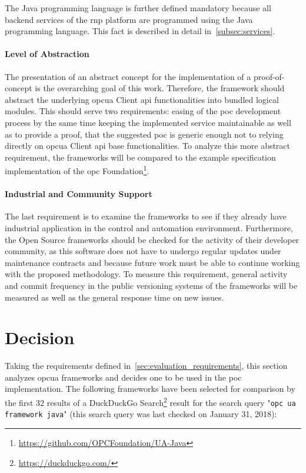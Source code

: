 \documentclass[
a4paper,
twoside,
headsepline,
cleardoublepage=empty,
parskip=half,
draft=false
]{scrbook}
\begin{document}
			The Java programming language is further defined mandatory because all backend services of the \gls{rnp} platform are programmed using the Java programming language.
			This fact is described in detail in~\cref{subsec:services}.
			
			\paragraph{Level of Abstraction} The presentation of an abstract concept for the implementation of a proof-of-concept is the overarching goal of this work. 
			Therefore, the framework should abstract the underlying \gls{opcua} Client \gls{api} functionalities into bundled logical modules. 
			This should serve two requirements: easing of the \gls{poc} development process by the same time  keeping the implemented service maintainable as well as to provide a proof, that the suggested \gls{poc} is generic enough not to relying directly on \gls{opcua} Client \gls{api} base functionalities. 
			To analyze this more abstract requirement, the frameworks will be compared to the example specification implementation of the \gls{opc} Foundation\footnote{\url{https://github.com/OPCFoundation/UA-Java}}. 
			
			\paragraph{Industrial and Community Support} The last requirement is to examine the frameworks to see if they already have industrial application in the control and automation environment.
			Furthermore, the Open Source frameworks should be checked for the activity of their developer community, as this software does not have to undergo regular updates under maintenance contracts and because future work must be able to continue working with the proposed methodology. To measure this requirement, general activity and commit frequency in the public versioning systems of the frameworks will be measured as well as the general response time on new issues.
			
		\section{Decision}\label{sec:evaluation_decision}
		
			Taking the requirements defined in~\cref{sec:evaluation_requirements}, this section analyzes \gls{opcua} frameworks and decides one to be used in the \gls{poc} implementation. The following frameworks have been selected for comparison by the first 32 results of a DuckDuckGo Search\footnote{\url{https://duckduckgo.com/}} result for the search query "\texttt{opc ua framework java}" (this search query was last checked on January 31, 2018):
			
\end{document}
